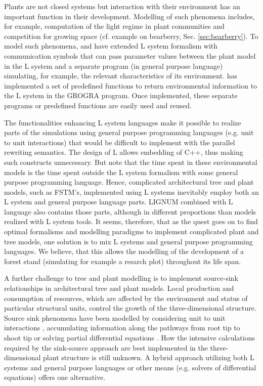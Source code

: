 Plants are  not closed systems but interaction  with their environment
has  an important function  in their  development.  Modelling  of such
phenomena includes,  for example, computation  of the light  regime in
plant communities  and competition for growing space  (cf.  example on
bearberry,  Sec.   \ref{sec:bearberry}).   To  model  such  phenomena,
\citet{mech:97} and  \citet{mech:96} have extended  L system formalism
with communication symbols that  can pass parameter values between the
plant model in the L system and a separate program (in general purpose
language) simulating, for example, the relevant characteristics of its
environment.   \citet{kurth:94} has  implemented a  set  of predefined
functions to return  environmental information to the L  system in the
GROGRA  program.    Once  implemented,  these   separate  programs  or
predefined functions are easily used and reused.

The functionalities  enhancing L system languages make  it possible to
realize  parts of  the simulations  using general  purpose programming
languages (e.g.  unit to unit interactions) that would be difficult to
implement  with the  parallel rewriting  semantics.  The  design  of L
allows embedding of C++, thus making such constructs unnecessary.  But
note that  the time  spent in these  environmental models is  the time
spent  outside  the  L  system  formalism with  some  general  purpose
programming language.  Hence, complicated architectural tree and plant
models, such as FSTM's,  implemented using L systems inevitably employ
both an L system and  general purpose language parts.  LIGNUM combined
with  L language  also  contains those  parts,  although in  different
proportions  than models  realized  with L  system  tools.  It  seems,
therefore, that  as the quest goes  on to find  optimal formalisms and
modelling paradigms  to implement  complicated plant and  tree models,
one  solution is  to mix  L  systems and  general purpose  programming
languages.   We  believe,  that  this  allows  the  modelling  of  the
development of a forest stand  (simulating for example a resarch plot)
throughout its life span.
 
A  further challenge  to  tree  and plant  modelling  is to  implement
source-sink  relationships  in architectural  tree  and plant  models.
Local production  and consumption of resources, which  are affected by
the environment and status of particular structural units, control the
growth of the three-dimensional structure.  Source sink phenomena have
been   modelled    by   considering   unit    to   unit   interactions
\citep{balandier:00}, accumulating information along the pathways from
root  tip   to  shoot  tip  \citep{dereffye:97}   or  solving  partial
differential  equations  \citep{deleuze:97,  palovaara:03}.   How  the
intensive calculations  required by the sink-source  approach are best
implemented in the three-dimensional plant structure is still unknown.
A  hybrid  approach  utilizing  both  L systems  and  general  purpose
languages  or other  means (e.g.   solvers of  differential equations)
offers one alternative.

